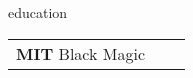 
\begin{rubric}{education}
	\begin{tabular}{@{}p{3cm}p{4cm}p{6cm}@{}}
		\entry*[2016 -- 2020] \textbf{MIT} Black Magic
	\end{tabular}
\end{rubric}